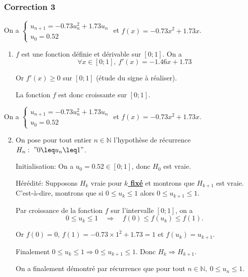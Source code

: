 \documentclass[15pt, mathserif]{beamer}
\begin{document}
\begin{frame}
\vspace{-10mm}
	\frametitle{Correction 3}
On a $\begin{cases} u_{n+1} = -0.73u_n^2+1.73u_n\\[1em] u_0 = 0.52\end{cases}$ et $f(x) = -0.73x^2+1.73x$.

\begin{enumerate}
	\item $f$ est une fonction définie et dérivable sur $[0;1]$. On a \[\forall x \in [0;1], ~ f'(x) = -1.46x+1.73\]

 Or $f'(x) \geq 0$ sur $[0;1]$ (étude du signe à réaliser). 

La fonction $f$ est donc croissante sur $[0;1]$.

\end{enumerate}
\end{frame}


\begin{frame}On a $\begin{cases} u_{n+1} = -0.73u_n^2+1.73u_n\\[1em] u_0 = 0.52\end{cases}$ et $f(x) = -0.73x^2+1.73x$.

\begin{enumerate}\setcounter{enumi}{1}

	\item On pose pour tout entier $n \in \mathbb{N}$ l'hypothèse de récurrence $H_n:~"0 \leq u_n \leq 1"$.

\medskip

Initialisation: On a $u_0 =0.52 \in [0;1]$, donc $H_0$ est vraie.

\medskip

Hérédité: Supposons $H_k$ vraie pour \textbf\underline{{$k$ fixé}} et montrons que $H_{k+1}$ est vraie. C'est-à-dire, montrons que si $0 \leq u_k \leq 1$ alors $0 \leq u_{k+1} \leq 1$.

 Par croissance de la fonction $f$ sur l'intervalle $[0;1]$, on a \[0\leq u_k \leq 1 \quad \Rightarrow \quad f(0) \leq f(u_k) \leq f(1).\]

 Or $f(0) = 0$, $f(1) = -0.73\times 1^2+1.73= 1$ et $f(u_k) = u_{k+1}$.

 Finalement $0\leq u_k \leq 1 \Rightarrow 0 \leq u_{k+1} \leq 1$. Donc $H_{k} \Rightarrow H_{k+1}$.

 On a finalement démontré par récurrence que pour tout $n \in\mathbb{N},~ 0 \leq u_n \leq 1$.

\end{enumerate}
\end{frame}
\end{document}
